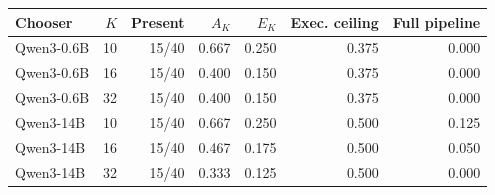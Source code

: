 \begin{tabular}{lrrrrrr}
\toprule
Chooser & $K$ & Present & $A_K$ & $E_K$ & Exec. ceiling & Full pipeline \\
\midrule
Qwen3-0.6B & 10 & 15/40 & 0.667 & 0.250 & 0.375 & 0.000 \\
Qwen3-0.6B & 16 & 15/40 & 0.400 & 0.150 & 0.375 & 0.000 \\
Qwen3-0.6B & 32 & 15/40 & 0.400 & 0.150 & 0.375 & 0.000 \\
\addlinespace
Qwen3-14B & 10 & 15/40 & 0.667 & 0.250 & 0.500 & 0.125 \\
Qwen3-14B & 16 & 15/40 & 0.467 & 0.175 & 0.500 & 0.050 \\
Qwen3-14B & 32 & 15/40 & 0.333 & 0.125 & 0.500 & 0.000 \\
\bottomrule
\end{tabular}
